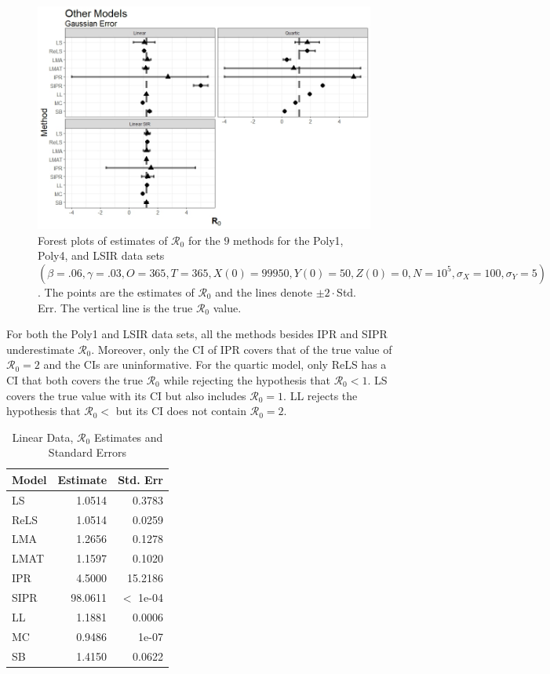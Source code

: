 \documentclass[12pt]{article}
\newcommand{\xxsir}{\ensuremath{9} } %
\newcommand{\rr}{\ensuremath{\mathcal{R}_0}}
\begin{document}
\begin{figure}[H]
  \begin{center}
    \includegraphics[scale=0.5]{images/other_n.jpeg}
  \caption{Forest plots of estimates of $\rr$ for the \xxsir methods for the Poly1, Poly4, and LSIR data sets $(\beta=.06, \gamma=.03, O=365, T=365, X(0)=99950, Y(0)=50, Z(0)=0, N=10^5, \sigma_X=100, \sigma_Y=5)$.  The points are the estimates of $\rr$ and the lines denote $\pm 2\cdot $Std. Err.  The vertical line is the true $\rr$ value.}
  \label{fig:other-res}	
  \end{center}
\end{figure}

For both the Poly1 and LSIR data sets, all the methods besides IPR and SIPR underestimate $\rr$.  Moreover, only the CI of IPR covers that of the true value of $\rr=2$ and the CIs are uninformative.  For the quartic model, only ReLS has a CI that both covers the true $\rr$ while rejecting the hypothesis that $\rr < 1$.  LS covers the true value with its CI but also includes $\rr=1$.  LL rejects the hypothesis that $\rr <$ but its CI does not contain $\rr=2$.

\begin{table}[H]

	\centering
	\begin{tabular}[t]{l|r|r}
		\hline
		Model & Estimate & Std. Err\\
		\hline
		LS & 1.0514 & 0.3783\\
		\hline
		ReLS & 1.0514 & 0.0259\\
		\hline
		LMA & 1.2656 & 0.1278\\
		\hline
		LMAT & 1.1597 & 0.1020\\
		\hline
		IPR & 4.5000 & 15.2186\\
		\hline
		SIPR & 98.0611 & $<$ 1e-04\\
		\hline
		LL & 1.1881 & 0.0006\\
		\hline
		MC & 0.9486 & 1e-07 \\
		\hline
		SB & 1.4150 & 0.0622\\
		\hline
	\end{tabular}
	\caption{Linear Data, $\rr$ Estimates and Standard Errors}\label{tab:other-res1}
\end{table}
\end{document}
